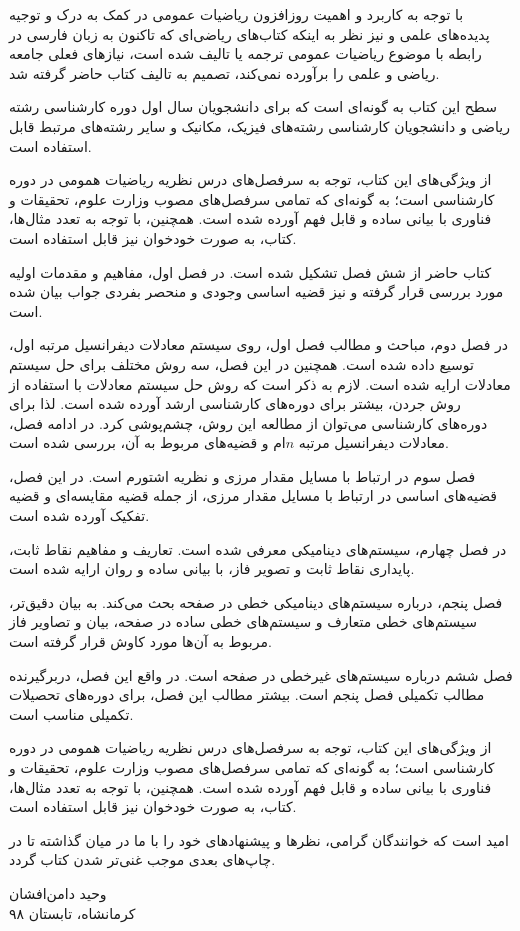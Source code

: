 با توجه به کاربرد و اهمیت روزافزون ریاضیات عمومی در کمک به درک و توجیه پدیده‌های علمی و نیز نظر به اینکه کتاب‌های ریاضی‌ای که تاکنون به زبان فارسی در رابطه با موضوع ریاضیات عمومی ترجمه یا تالیف شده‌ است، نیازهای فعلی جامعه ریاضی و علمی را برآورده نمی‌کند، 
تصمیم  به تالیف کتاب حاضر  گرفته شد.


سطح این کتاب به گونه‌ای است که  برای دانشجویان سال اول دوره کارشناسی رشته ریاضی و دانشجویان کارشناسی رشته‌های فیزیک، مکانیک و سایر رشته‌های مرتبط قابل استفاده است.

 از ویژگی‌های این کتاب، توجه به سرفصل‌های درس نظریه ریاضیات همومی در دوره کارشناسی  است؛ به گونه‌ای  که تمامی سرفصل‌های مصوب وزارت علوم، تحقیقات و فناوری با بیانی ساده و قابل فهم آورده شده است. همچنین، با توجه به تعدد مثال‌ها، کتاب،  به صورت خودخوان نیز 
 قابل استفاده  است.

  کتاب حاضر از شش فصل تشکیل شده است. در فصل اول، مفاهیم و مقدمات اولیه مورد بررسی قرار گرفته و نیز قضیه اساسی وجودی و منحصر بفردی جواب بیان شده است.
 
 در فصل دوم، مباحث و مطالب فصل اول، روی سیستم معادلات دیفرانسیل مرتبه اول، توسیع داده شده است. همچنین در این فصل، سه روش مختلف برای حل سیستم معادلات ارایه شده است. لازم به ذکر است که روش حل سیستم معادلات با استفاده از روش جردن، بیشتر برای دوره‌های کارشناسی ارشد
 آورده شده است. لذا برای دوره‌های کارشناسی می‌توان از مطالعه این روش، چشم‌پوشی کرد. در ادامه فصل، معادلات دیفرانسیل مرتبه $n$ام و قضیه‌های مربوط به آن، بررسی شده‌ است.
 
 فصل سوم در ارتباط با مسایل مقدار مرزی و نظریه اشتورم است. در این فصل، قضیه‌های اساسی در ارتباط با مسایل مقدار مرزی، از جمله قضیه مقایسه‌ای  و قضیه تفکیک آورده شده است. 
 
 در فصل چهارم، سیستم‌های دینامیکی معرفی شده‌ است. تعاریف و مفاهیم نقاط ثابت، پایداری نقاط ثابت و تصویر فاز، با بیانی ساده و روان ارایه شده است. 
 
 فصل پنجم، درباره سیستم‌های دینامیکی خطی در صفحه بحث می‌کند. به بیان دقیق‌تر، سیستم‌های خطی متعارف و سیستم‌های خطی ساده
 در صفحه، بیان و تصاویر فاز مربوط به آن‌ها مورد کاوش قرار گرفته است.
 
 فصل ششم درباره سیستم‌های غیرخطی در صفحه است. در واقع  این فصل، دربرگیرنده مطالب تکمیلی فصل پنجم است. بیشتر مطالب این فصل، برای دوره‌های تحصیلات تکمیلی مناسب است.
 
 از ویژگی‌های این کتاب، توجه به سرفصل‌های درس نظریه ریاضیات همومی در دوره کارشناسی  است؛ به گونه‌ای  که تمامی سرفصل‌های مصوب وزارت علوم، تحقیقات و فناوری با بیانی ساده و قابل فهم آورده شده است. همچنین، با توجه به تعدد مثال‌ها، کتاب،  به صورت خودخوان نیز 
 قابل استفاده  است.

امید است که خوانندگان گرامی، نظرها و پیشنهاد‌های خود را با ما در میان گذاشته تا در چاپ‌های بعدی موجب غنی‌تر شدن کتاب گردد.


\vspace*{1\baselineskip}
\begin{flushleft}
وحید دامن‌افشان\\
کرمانشاه، تابستان ۹۸
\end{flushleft}